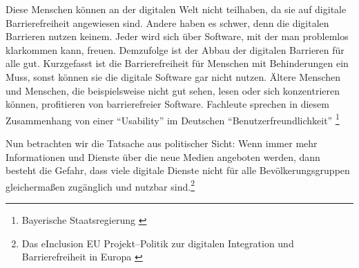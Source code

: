 Diese Menschen können an der digitalen Welt nicht teilhaben, da sie auf digitale Barrierefreiheit angewiesen sind. Andere haben es schwer, denn die digitalen Barrieren nutzen keinem. Jeder wird sich über Software, mit der man problemlos klarkommen kann, freuen. Demzufolge ist der Abbau der digitalen Barrieren für alle gut. Kurzgefasst ist die Barrierefreiheit für Menschen mit Behinderungen ein Muss, sonst können sie die digitale Software gar nicht nutzen. Ältere Menschen und Menschen, die beispielsweise nicht gut sehen, lesen oder sich konzentrieren können, profitieren von barrierefreier Software. Fachleute sprechen in diesem Zusammenhang von einer "`Usability"' im Deutschen "`Benutzerfreundlichkeit"' \footnote{Bayerische Staatsregierung \cite{BS}}

Nun betrachten wir die Tatsache aus politischer Sicht: Wenn immer mehr Informationen und Dienste über die neue Medien angeboten werden, dann besteht die Gefahr, dass viele digitale Dienste nicht für alle Bevölkerungsgruppen gleichermaßen zugänglich und nutzbar sind.\footnote{Das eInclusion EU Projekt--Politik zur digitalen Integration und Barrierefreiheit in Europa \cite{redingeinclusion}}